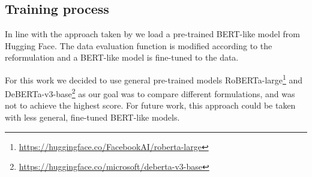 \subsection{Training process}
In line with the approach taken by \citep{ails-lab} we load a pre-trained BERT-like model from Hugging Face.
The data evaluation function is modified according to the reformulation and a BERT-like model is fine-tuned to the data.

For this work we decided to use general pre-trained models RoBERTa-large\footnote[4]{\url{https://huggingface.co/FacebookAI/roberta-large}} \citep{roberta} and DeBERTa-v3-base\footnote[5]{\url{https://huggingface.co/microsoft/deberta-v3-base}} \citep{deberta,debertav3} as our goal was to compare different formulations, and was not to achieve the highest score.
For future work, this approach could be taken with less general, fine-tuned BERT-like models.

\pagebreak